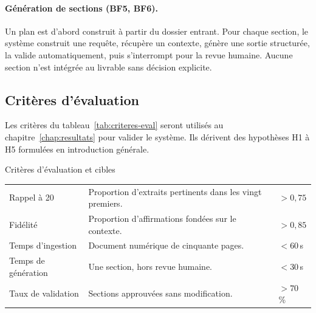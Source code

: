 \paragraph{Génération de sections (BF5, BF6).}
Un plan est d'abord construit à partir du dossier entrant. Pour chaque
section, le système construit une requête, récupère un contexte, génère
une sortie structurée, la valide automatiquement, puis s'interrompt pour
la revue humaine. Aucune section n'est intégrée au livrable sans décision
explicite.

\subsection{Critères d'évaluation}

Les critères du tableau~\ref{tab:criteres-eval} seront utilisés au
chapitre~\ref{chap:resultats} pour valider le système. Ils dérivent des
hypothèses H1 à H5 formulées en introduction générale.

\begin{btptable}{Critères d'évaluation et cibles}
\label{tab:criteres-eval}
\begin{tabularx}{\linewidth}{@{}L{3.4cm} Y C{2.6cm}@{}}
\toprule
{}
 &  &  \\
\midrule
Rappel à 20        & Proportion d'extraits pertinents dans les vingt premiers. & $> 0{,}75$ \\
Fidélité           & Proportion d'affirmations fondées sur le contexte. & $> 0{,}85$ \\
Temps d'ingestion  & Document numérique de cinquante pages. & $< 60$\,s \\
Temps de génération & Une section, hors revue humaine. & $< 30$\,s \\
Taux de validation & Sections approuvées sans modification. & $> 70$\,\% \\
\bottomrule
\end{tabularx}
\end{btptable}
